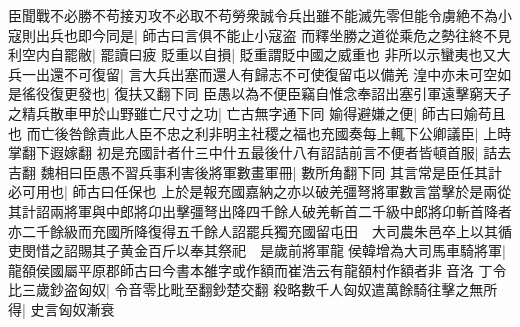 臣聞戰不必勝不苟接刃攻不必取不苟勞衆誠令兵出雖不能滅先零但能令虜絶不為小寇則出兵也即今同是|{
	師古曰言俱不能止小寇盗}
而釋坐勝之道從乘危之勢往終不見利空内自罷敝|{
	罷讀曰疲}
貶重以自損|{
	貶重謂貶中國之威重也}
非所以示蠻夷也又大兵一出還不可復留|{
	言大兵出塞而還人有歸志不可使復留屯以備羌}
湟中亦未可空如是徭役復更發也|{
	復扶又翻下同}
臣愚以為不便臣竊自惟念奉詔出塞引軍遠擊窮天子之精兵散車甲於山野雖亡尺寸之功|{
	亡古無字通下同}
媮得避嫌之便|{
	師古曰媮苟且也}
而亡後咎餘責此人臣不忠之利非明主社稷之福也充國奏每上輒下公卿議臣|{
	上時掌翻下遐嫁翻}
初是充國計者什三中什五最後什八有詔詰前言不便者皆頓首服|{
	詰去吉翻}
魏相曰臣愚不習兵事利害後將軍數畫軍冊|{
	數所角翻下同}
其言常是臣任其計必可用也|{
	師古曰任保也}
上於是報充國嘉納之亦以破羌彊弩將軍數言當擊於是兩從其計詔兩將軍與中郎將卬出擊彊弩出降四千餘人破羌斬首二千級中郎將卬斬首降者亦二千餘級而充國所降復得五千餘人詔罷兵獨充國留屯田　大司農朱邑卒上以其循吏閔惜之詔賜其子黄金百斤以奉其祭祀　是歲前將軍龍侯韓增為大司馬車騎將軍|{
	龍頟侯國屬平原郡師古曰今書本雒字或作額而崔浩云有龍頟村作額者非音洛}
丁令比三歲鈔盗匈奴|{
	令音零比毗至翻鈔楚交翻}
殺略數千人匈奴遣萬餘騎往擊之無所得|{
	史言匈奴漸衰}


